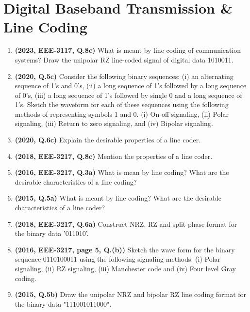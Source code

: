 \documentclass[12pt, a4paper]{article}
\begin{document}
	\section{Digital Baseband Transmission \& Line Coding}
	\begin{enumerate}
		\item \textbf{(2023, EEE-3117, Q.8c)} What is meant by line coding of communication systems? Draw the unipolar RZ line-coded signal of digital data 1010011.
		\item \textbf{(2020, Q.5c)} Consider the following binary sequences: (i) an alternating sequence of 1's and 0's, (ii) a long sequence of 1's followed by a long sequence of 0's, (iii) a long sequence of 1's followed by single 0 and a long sequence of 1's. Sketch the waveform for each of these sequences using the following methods of representing symbols 1 and 0. (i) On-off signaling, (ii) Polar signaling, (iii) Return to zero signaling, and (iv) Bipolar signaling.
		
		\item \textbf{(2020, Q.6c)} Explain the desirable properties of a line coder.
		\item \textbf{(2018, EEE-3217, Q.8c)} Mention the properties of a line coder.
		\item \textbf{(2016, EEE-3217, Q.3a)} What is mean by line coding? What are the desirable characteristics of a line coding?
		\item \textbf{(2015, Q.5a)} What is meant by line coding? What are the desirable characteristics of a line coder?
		
		\item \textbf{(2018, EEE-3217, Q.6a)} Construct NRZ, RZ and split-phase format for the binary data '011010'.
		
		\item \textbf{(2016, EEE-3217, page 5, Q.(b))} Sketch the wave form for the binary sequence 0110100011 using the following signaling methods. (i) Polar signaling, (ii) RZ signaling, (iii) Manchester code and (iv) Four level Gray coding.
		
		\item \textbf{(2015, Q.5b)} Draw the unipolar NRZ and bipolar RZ line coding format for the binary data "111001011000".
		
	\end{enumerate}
	
\end{document}
